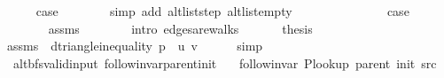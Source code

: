 \begin{isabellebody}
\ \ \ \ \isamarkupfalse%
\ {\isacharquery}{\kern0pt}case\isanewline
\ \ \ \ \ \ \isamarkupfalse%
\ {\isacharparenleft}{\kern0pt}simp\ add{\isacharcolon}{\kern0pt}\ alt{\isacharunderscore}{\kern0pt}list{\isacharunderscore}{\kern0pt}step\ alt{\isacharunderscore}{\kern0pt}list{\isacharunderscore}{\kern0pt}empty{\isacharparenright}{\kern0pt}\isanewline
\ \ \isamarkupfalse%
\isanewline
\ \ \ \ \isamarkupfalse%
\ {}\isanewline
\ \ \ \ \isamarkupfalse%
\ {\isacharquery}{\kern0pt}case\isanewline
\ \ \ \ \ \ \isamarkupfalse%
\ assms{\isacharparenleft}{\kern0pt}{}{\isacharparenright}{\kern0pt}\isanewline
\ \ \ \ \ \ \isamarkupfalse%
\ {\isacharparenleft}{\kern0pt}intro\ edges{\isacharunderscore}{\kern0pt}are{\isacharunderscore}{\kern0pt}walks{\isacharparenright}{\kern0pt}\isanewline
\ \ \isamarkupfalse%
\isanewline
\ \ \isamarkupfalse%
\ {\isacharquery}{\kern0pt}thesis\isanewline
\ \ \ \ \isamarkupfalse%
\ assms{\isacharparenleft}{\kern0pt}{}{\isacharcomma}{\kern0pt}\ {}{\isacharparenright}{\kern0pt}\ d{\isacharunderscore}{\kern0pt}triangle{\isacharunderscore}{\kern0pt}inequality{\isacharbrackleft}{\kern0pt}\ {\isacharquery}{\kern0pt}p\ {\isacharequal}{\kern0pt}\ {\isachardoublequoteopen}{\isacharbrackleft}{\kern0pt}u{\isacharcomma}{\kern0pt}\ v{\isacharbrackright}{\kern0pt}{\isachardoublequoteclose}{\isacharbrackright}{\kern0pt}\isanewline
\ \ \ \ \isamarkupfalse%
\ simp\isanewline
{}\isamarkupfalse%
%
\endisatagproof
{\isafoldproof}%
%
\isadelimproof
%
\endisadelimproof
%
\isadelimdocument
%
\endisadelimdocument
%
\isatagdocument
%
\isamarkuptrue%
%
\isamarkupsubsubsection{%
}
\isamarkuptrue%
%
\endisatagdocument
{\isafolddocument}%
%
\isadelimdocument
%
\endisadelimdocument
{}\isamarkupfalse%
\ {\isacharparenleft}{\kern0pt}\ alt{\isacharunderscore}{\kern0pt}bfs{\isacharunderscore}{\kern0pt}valid{\isacharunderscore}{\kern0pt}input{\isacharparenright}{\kern0pt}\ follow{\isacharunderscore}{\kern0pt}invar{\isacharunderscore}{\kern0pt}parent{\isacharunderscore}{\kern0pt}init{\isacharcolon}{\kern0pt}\isanewline
\ \ \ {\isachardoublequoteopen}follow{\isacharunderscore}{\kern0pt}invar\ {\isacharparenleft}{\kern0pt}P{\isacharunderscore}{\kern0pt}lookup\ {\isacharparenleft}{\kern0pt}parent\ {\isacharparenleft}{\kern0pt}init\ src{\isacharparenright}{\kern0pt}{\isacharparenright}{\kern0pt}{\isacharparenright}{\kern0pt}{\isachardoublequoteclose}\isanewline

\end{isabellebody}

